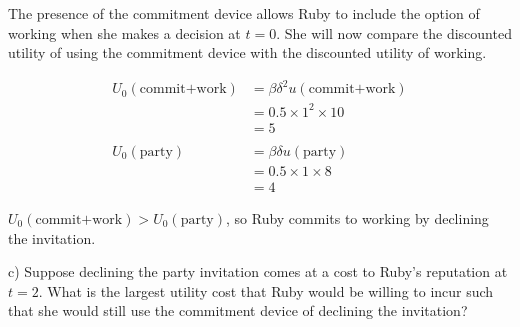 \documentclass[
  letterpaper,
  DIV=11,
  numbers=noendperiod]{scrreprt}
\begin{document}
\begin{tcolorbox}[enhanced jigsaw, title=\textcolor{quarto-callout-tip-color}{\faLightbulb}\hspace{0.5em}{Answer}, toprule=.15mm, colback=white, breakable, titlerule=0mm, colframe=quarto-callout-tip-color-frame, coltitle=black, opacityback=0, rightrule=.15mm, colbacktitle=quarto-callout-tip-color!10!white, bottomtitle=1mm, opacitybacktitle=0.6, arc=.35mm, bottomrule=.15mm, toptitle=1mm, leftrule=.75mm, left=2mm]

The presence of the commitment device allows Ruby to include the option
of working when she makes a decision at \(t=0\). She will now compare
the discounted utility of using the commitment device with the
discounted utility of working.

\begin{align*}
U_0(\text{commit+work})&=\beta\delta^2 u(\text{commit+work}) \\
&=0.5\times 1^2\times 10 \\
&=5 \\
\\
U_0(\text{party})&=\beta\delta u(\text{party}) \\
&=0.5\times 1\times 8 \\
&=4
\end{align*}

\(U_0(\text{commit+work})>U_0(\text{party})\), so Ruby commits to
working by declining the invitation.

\end{tcolorbox}

c) Suppose declining the party invitation comes at a cost to Ruby's
reputation at \(t=2\). What is the largest utility cost that Ruby would
be willing to incur such that she would still use the commitment device
of declining the invitation?
\end{document}
